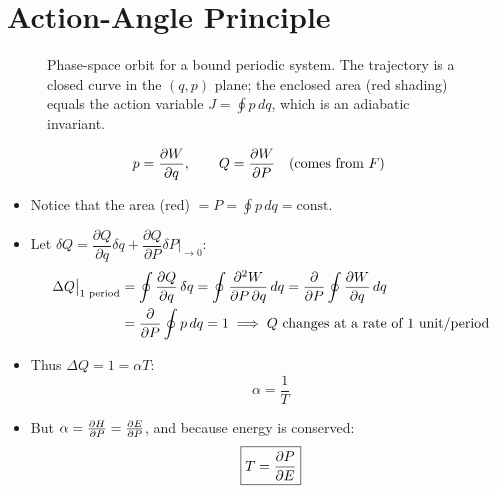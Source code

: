 \section{Action-Angle Principle}

\begin{figure}[H]
\begin{center}
\end{center}
\caption{Phase-space orbit for a bound periodic system. The trajectory is a closed curve in the $(q,p)$ plane; the enclosed area (red shading) equals the action variable $J = \oint p\,dq$, which is an adiabatic invariant.}
\label{fig:phase_space_orbit}
\end{figure}

\[
    p = \pdv{W}{q},\qquad Q = \pdv{W}{P}
    \quad\text{(comes from }F\text{)}
\]

\begin{itemize}
    \item Notice that the area (red) $= P = \oint p\,dq = \text{const}$.
    \item Let $\delta Q = \dfrac{\partial Q}{\partial q}\delta q + \dfrac{\partial Q}{\partial P}\delta P \bigg|_{\to 0}$:
    \begin{align*}
        \Delta Q\big|_{\text{1 period}}
        &= \oint\pdv{Q}{q}\,\delta q
        = \oint\frac{\partial^2 W}{\partial P\,\partial q}\,dq
        = \pdv{}{P}\oint\pdv{W}{q}\,dq \\
        &= \pdv{}{P}\oint p\,dq = 1
        \implies Q\text{ changes at a rate of 1 unit/period}
    \end{align*}
    \item Thus $\Delta Q = 1 = \alpha T$:
    \[
        \boxed{\alpha = \frac{1}{T}}
    \]
    \item But $\alpha = \pdv{H}{P} = \pdv{E}{P}$, and because energy is conserved:
    \[
        \boxed{T = \pdv{P}{E}}
    \]
\end{itemize}

